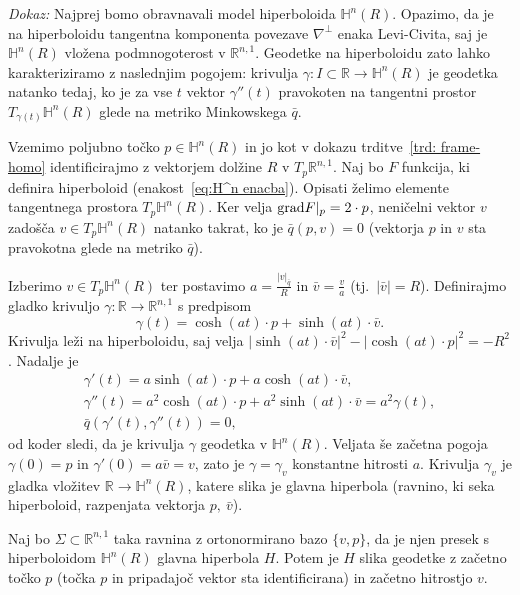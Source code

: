 \documentclass[a4paper]{article}
\begin{document}
\noindent
{\em Dokaz:\/}
Najprej bomo obravnavali model hiperboloida $\mathbb{H}^{n}(R)$.
Opazimo, da je na hiperboloidu tangentna komponenta povezave $\nabla^{\perp}$ enaka Levi-Civita, saj je $\mathbb{H}^{n}(R)$ vložena podmnogoterost v $\mathbb{R}^{n,1}$.
Geodetke na hiperboloidu zato lahko karakteriziramo z naslednjim pogojem: krivulja $\gamma \colon I \subset \mathbb{R} \to \mathbb{H}^{n}(R)$ je geodetka natanko tedaj, ko je za vse $t$ vektor $\gamma''(t)$ pravokoten na tangentni prostor $T_{\gamma(t)}\mathbb{H}^{n}(R)$ glede na metriko Minkowskega $\bar{q}$.

Vzemimo poljubno točko $p \in \mathbb{H}^{n}(R)$ in jo kot v dokazu trditve~\ref{trd: frame-homo} identificirajmo z vektorjem dolžine $R$ v $T_{p}\mathbb{R}^{n,1}$. Naj bo $F$ funkcija, ki definira hiperboloid (enakost~\ref{eq:H^n enacba}).
Opisati želimo elemente tangentnega prostora $T_{p}\mathbb{H}^{n}(R)$. Ker velja $\textup{grad}F|_{p}=2\cdot p$, neničelni vektor $v$ zadošča $v \in T_{p}\mathbb{H}^{n}(R)$ natanko takrat, ko je $\bar{q}(p,v)=0$ (vektorja $p$ in $v$ sta pravokotna glede na metriko $\bar{q}$).

Izberimo $v \in T_{p}\mathbb{H}^{n}(R)$ ter postavimo $a=\frac{|v|_{\bar{q}}}{R}$ in $\bar{v}=\frac{v}{a}$ (tj.~$|\bar{v}|=R$).
Definirajmo gladko krivuljo $\gamma \colon \mathbb{R} \to \mathbb{R}^{n,1}$ s predpisom
\[ \gamma(t) = \cosh(at) \cdot p + \sinh(at) \cdot \bar{v}. \]
Krivulja leži na hiperboloidu, saj velja $ |\sinh(at) \cdot \bar{v}|^2 - |\cosh(at) \cdot p|^2 = -R^2$. Nadalje je 
\begin{gather*}
\gamma'(t) = a\sinh(at) \cdot p + a\cosh(at) \cdot \bar{v}, \\
\gamma''(t) = a^2\cosh(at) \cdot p + a^2\sinh(at) \cdot \bar{v} = a^2 \gamma(t), \\
\bar{q}(\gamma'(t), \gamma''(t)) = 0,
\end{gather*}
od koder sledi, da je krivulja $\gamma$ geodetka v $\mathbb{H}^{n}(R)$.
Veljata še začetna pogoja $\gamma(0)=p$ in $\gamma'(0)=a\bar{v}=v$, zato je $\gamma = \gamma_{v}$ konstantne hitrosti $a$.
Krivulja $\gamma_{v}$ je gladka vložitev $\mathbb{R} \to \mathbb{H}^{n}(R)$, katere slika je glavna hiperbola (ravnino, ki seka hiperboloid, razpenjata vektorja $p, \ \bar{v}$).

Naj bo $\Sigma \subset \mathbb{R}^{n,1}$ taka ravnina z ortonormirano bazo $\{v,p\}$, da je njen presek s hiperboloidom $\mathbb{H}^{n}(R)$ glavna hiperbola $H$. Potem je $H$ slika geodetke z začetno točko $p$ (točka $p$ in pripadajoč vektor sta identificirana) in začetno hitrostjo $v$.\newline
\end{document}
